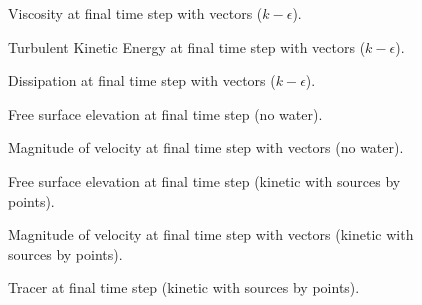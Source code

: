 \begin{figure}[H]
\centering
{}
\caption{Viscosity at final time step with vectors ($k-\epsilon$).}
\label{t2d:init:viscosityseq}
\end{figure}

\begin{figure}[H]
\centering
{}
\caption{Turbulent Kinetic Energy at final time step with vectors ($k-\epsilon$).}
\label{t2d:init:tkeseq}
\end{figure}

\begin{figure}[H]
\centering
{}
\caption{Dissipation at final time step with vectors ($k-\epsilon$).}
\label{t2d:init:dissipationseq}
\end{figure}

\begin{figure}[H]
\centering
{}
\caption{Free surface elevation at final time step (no water).}
\label{t2d:init:freesurfnowater}
\end{figure}

\begin{figure}[H]
\centering
{}
\caption{Magnitude of velocity at final time step with vectors (no water).}
\label{t2d:init:velovectnowater}
\end{figure}

\begin{figure}[H]
\centering
{}
\caption{Free surface elevation at final time step (kinetic with sources by points).}
\label{t2d:init:freesurfkin}
\end{figure}

\begin{figure}[H]
\centering
{}
\caption{Magnitude of velocity at final time step with vectors (kinetic with sources by points).}
\label{t2d:init:velovectkin}
\end{figure}

\begin{figure}[H]
\centering
{}
\caption{Tracer at final time step (kinetic with sources by points).}
\label{t2d:init:tracerkin}
\end{figure}

